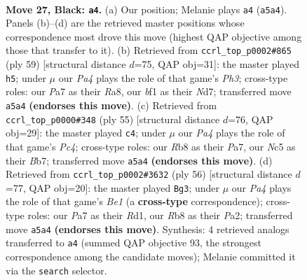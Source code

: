 \documentclass[11pt]{article}
\begin{document}
\clearpage

\begin{figure}[p]\centering
\begin{subfigure}{0.46\textwidth}\centering
\resizebox{\linewidth}{!}{%
\newchessgame
\chessboard[
  setfen={1rb1r1k1/p1p2pp1/7p/p1nPn2P/8/2P1P3/6R1/R1B1KBN1 b Q - 0 27},
  showmover=false,
  pgfstyle=straightmove, color=movearrow, markmove={a5-a4}
]}
\caption{}
\end{subfigure}\hfill
\begin{subfigure}{0.46\textwidth}\centering
\resizebox{\linewidth}{!}{%
\newchessgame
\chessboard[
  setfen={r3r1k1/p2n1p2/2ppb1pp/8/P3P2P/2K1B3/1RB2PP1/4R3 b - - 10 30},
  showmover=false,
  pgfstyle=straightmove, color=movearrow, markmove={h6-h5}
]}
\caption{}
\end{subfigure}
\\[4pt]
\begin{subfigure}{0.46\textwidth}\centering
\resizebox{\linewidth}{!}{%
\newchessgame
\chessboard[
  setfen={3r1k2/pb3pp1/7p/1pp1P2P/3n1P2/3B2R1/P5P1/2R1K3 b - - 1 28},
  showmover=false,
  pgfstyle=straightmove, color=movearrow, markmove={c5-c4}
]}
\caption{}
\end{subfigure}\hfill
\begin{subfigure}{0.46\textwidth}\centering
\resizebox{\linewidth}{!}{%
\newchessgame
\chessboard[
  setfen={r5k1/p4p2/2p1rbn1/2P2Npp/3P4/5R1P/P5P1/3RB1K1 w - - 0 29},
  showmover=false,
  pgfstyle=straightmove, color=movearrow, markmove={e1-g3}
]}
\caption{}
\end{subfigure}
\caption{\textbf{Move 27, Black: \texttt{a4}.} (a) Our position; Melanie plays \texttt{a4} (\texttt{a5a4}). Panels (b)--(d) are the retrieved master positions whose correspondence most drove this move (highest QAP objective among those that transfer to it). (b) Retrieved from \texttt{ccrl\_top\_p0002\#865} (ply 59) [structural distance $d$=75, QAP obj=31]: the master played \texttt{h5}; under $\mu$ our \emph{Pa4} plays the role of that game's \emph{Ph3}; cross-type roles: our \emph{P}a7 as their \emph{R}a8, our \emph{b}f1 as their \emph{N}d7; transferred move \texttt{a5a4} \textbf{(endorses this move)}. (c) Retrieved from \texttt{ccrl\_top\_p0000\#348} (ply 55) [structural distance $d$=76, QAP obj=29]: the master played \texttt{c4}; under $\mu$ our \emph{Pa4} plays the role of that game's \emph{Pc4}; cross-type roles: our \emph{R}b8 as their \emph{P}a7, our \emph{N}c5 as their \emph{B}b7; transferred move \texttt{a5a4} \textbf{(endorses this move)}. (d) Retrieved from \texttt{ccrl\_top\_p0002\#3632} (ply 56) [structural distance $d$=77, QAP obj=20]: the master played \texttt{Bg3}; under $\mu$ our \emph{Pa4} plays the role of that game's \emph{Be1} (a \textbf{cross-type} correspondence); cross-type roles: our \emph{P}a7 as their \emph{R}d1, our \emph{R}b8 as their \emph{P}a2; transferred move \texttt{a5a4} \textbf{(endorses this move)}. Synthesis: 4 retrieved analogs transferred to \texttt{a4} (summed QAP objective 93, the strongest correspondence among the candidate moves); Melanie committed it via the \texttt{search} selector.}
\label{fig:thought-m53}
\end{figure}
\end{document}
